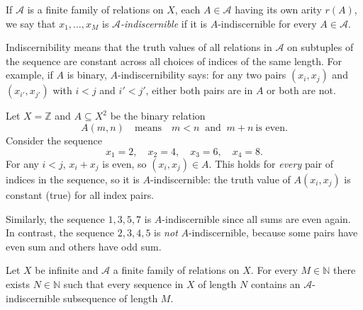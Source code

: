 If $\mathcal{A}$ is a finite family of relations on $X$, each $A \in \mathcal{A}$ having its own arity $r(A)$, we say that $x_1, \dots, x_M$ is \emph{$\mathcal{A}$-indiscernible} if it is $A$-indiscernible for every $A \in \mathcal{A}$.

\begin{remarknl}
    Indiscernibility means that the truth values of all relations in $\mathcal{A}$ on subtuples of the sequence are constant across all choices of indices of the same length.
    For example, if $A$ is binary, $A$-indiscernibility says: for any two pairs $(x_i, x_j)$ and $(x_{i'}, x_{j'})$ with $i<j$ and $i'<j'$, either both pairs are in $A$ or both are not.
\end{remarknl}

\begin{example}
    Let $X = \mathbb{Z}$ and $A \subseteq X^2$ be the binary relation
    \[
        A(m, n) \quad\text{means}\quad m < n \ \text{ and } \ m+n \ \text{is even}.
    \]
    Consider the sequence
    \[
        x_1 = 2,\quad x_2 = 4,\quad x_3 = 6,\quad x_4 = 8.
    \]
    For any $i < j$, $x_i + x_j$ is even, so $(x_i, x_j) \in A$.
    This holds for \emph{every} pair of indices in the sequence, so it is $A$-indiscernible: the truth value of $A(x_i, x_j)$ is constant (true) for all index pairs.

    Similarly, the sequence $1, 3, 5, 7$ is $A$-indiscernible since all sums are even again.
    In contrast, the sequence $2, 3, 4, 5$ is \emph{not} $A$-indiscernible, because some pairs have even sum and others have odd sum.
\end{example}

\begin{corollary}{\label{cor:ramsey-cor}}
    Let $X$ be infinite and $\mathcal{A}$ a finite family of relations on $X$. For every $M \in \mathbb{N}$ there exists $N \in \mathbb{N}$ such that every sequence in $X$ of length $N$ contains an $\mathcal{A}$-indiscernible subsequence of length $M$.
\end{corollary}

